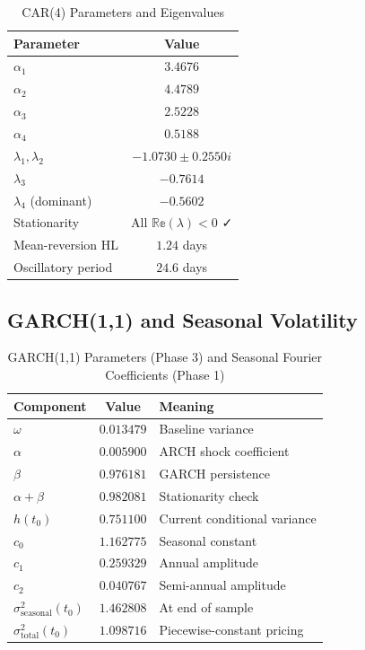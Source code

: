 \documentclass[11pt, a4paper, twoside]{article}
\begin{document}
\begin{table}[ht]
\centering
\caption{CAR(4) Parameters and Eigenvalues}
\label{tbl:car4_params_eig}
\small
\begin{tabularx}{0.6\textwidth}{l|c}
\toprule
\textbf{Parameter} & \textbf{Value} \\
\midrule
$\alpha_1$ & $3.4676$ \\
$\alpha_2$ & $4.4789$ \\
$\alpha_3$ & $2.5228$ \\
$\alpha_4$ & $0.5188$ \\
\midrule
$\lambda_1, \lambda_2$ & $-1.0730 \pm 0.2550i$ \\
$\lambda_3$ & $-0.7614$ \\
$\lambda_4$ (dominant) & $-0.5602$ \\
Stationarity & All $\mathbb{Re}(\lambda) < 0$ ✓ \\
Mean-reversion HL & $1.24$ days \\
Oscillatory period & $24.6$ days \\
\bottomrule
\end{tabularx}
\end{table}

\subsection*{GARCH(1,1) and Seasonal Volatility}

\begin{table}[ht]
\centering
\caption{GARCH(1,1) Parameters (Phase 3) and Seasonal Fourier Coefficients (Phase 1)}
\label{tbl:garch_seasonal}
\small
\begin{tabularx}{0.7\textwidth}{l|c|l}
\toprule
\textbf{Component} & \textbf{Value} & \textbf{Meaning} \\
\midrule
$\omega$ & $0.013479$ & Baseline variance \\
$\alpha$ & $0.005900$ & ARCH shock coefficient \\
$\beta$ & $0.976181$ & GARCH persistence \\
$\alpha + \beta$ & $0.982081$ & Stationarity check \\
$h(t_0)$ & $0.751100$ & Current conditional variance \\
\midrule
$c_0$ & $1.162775$ & Seasonal constant \\
$c_1$ & $0.259329$ & Annual amplitude \\
$c_2$ & $0.040767$ & Semi-annual amplitude \\
$\sigma^2_{\text{seasonal}}(t_0)$ & $1.462808$ & At end of sample \\
$\sigma^2_{\text{total}}(t_0)$ & $1.098716$ & Piecewise-constant pricing \\
\bottomrule
\end{tabularx}
\end{table}
\end{document}
